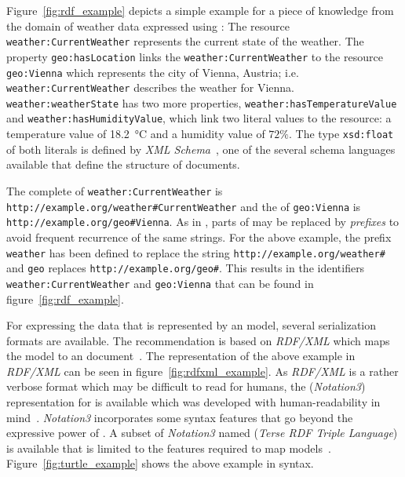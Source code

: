 Figure~\ref{fig:rdf_example} depicts a simple example for a piece of knowledge from the domain of weather data expressed using : The resource \texttt{weather:CurrentWeather} represents the current state of the weather. The property \texttt{geo:hasLocation} links the \texttt{weather:CurrentWeather} to the resource \texttt{geo:Vienna} which represents the city of Vienna, Austria; i.e. \texttt{weather:CurrentWeather} describes the weather for Vienna. \texttt{weather:weatherState} has two more properties, \texttt{weather:hasTemperatureValue} and \texttt{weather:hasHumidityValue}, which link two literal values to the resource: a temperature value of \SI{18.2}{\celsius} and a humidity value of $72 \%$. The type \texttt{xsd:float} of both literals is defined by \emph{XML Schema}~\cite{xml-schema,xml-schema-datatypes}, one of the several  schema languages available that define the structure of  documents.

The complete  of \texttt{weather:CurrentWeather} is \texttt{http://example.org/weather\#CurrentWeather} and the  of \texttt{geo:Vienna} is \texttt{http://example.org/geo\#Vienna}. As in , parts of  may be replaced by \emph{prefixes} to avoid frequent recurrence of the same strings. For the above example, the prefix \texttt{weather} has been defined to replace the string \texttt{http://example.org/weather\#} and \texttt{geo} replaces \texttt{http://example.org/geo\#}. This results in the identifiers \texttt{weather:CurrentWeather} and \texttt{geo:Vienna} that can be found in figure~\ref{fig:rdf_example}.

For expressing the data that is represented by an  model, several serialization formats are available. The  recommendation is based on \emph{RDF/XML} which maps the  model to an  document~\cite{RDF_XML}. The representation of the above example in \emph{RDF/XML} can be seen in figure~\ref{fig:rdfxml_example}. As \emph{RDF/XML} is a rather verbose format which may be difficult to read for humans, the  (\emph{Notation3}) representation for  is available which was developed with human-readability in mind~\cite{Notation3}. \emph{Notation3} incorporates some syntax features that go beyond the expressive power of . A subset of \emph{Notation3} named  (\emph{Terse RDF Triple Language}) is available that is limited to the features required to map  models~\cite{Turtle}. Figure~\ref{fig:turtle_example} shows the above example in  syntax.

